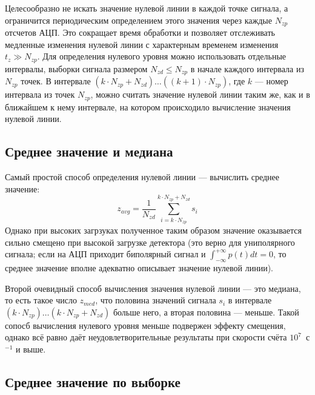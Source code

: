Целесообразно не искать значение нулевой линии в каждой точке сигнала, а ограничится периодическим определением этого значения через каждые $N_{zp}$ отсчетов АЦП. Это сокращает время обработки и позволяет отслеживать медленные изменения нулевой линии с характерным временем изменения $t_z \gg N_{zp}$. Для определения нулевого уровня можно использовать отдельные интервалы, выборки сигнала размером $N_{zd} \le N_{zp}$ в начале каждого интервала из $N_{zp}$ точек. В интервале $( k \cdot N_{zp} + N_{zd} ) \ldots ((k + 1) \cdot N_{zp})$, где $k$ --- номер интервала из точек $N_{zp}$, можно считать значение нулевой линии таким же, как и в ближайшем к нему интервале, на котором происходило вычисление значения нулевой линии. \cite{Khilkevitch2020}


\subsection{Среднее значение и медиана}

Самый простой способ определения нулевой линии --- вычислить среднее значение:
\begin{equation*}
  z_{avg} = \frac{1}{N_{zd}} \sum\limits_{i = k \cdot N_{zp}}^{  k \cdot N_{zp} + N_{zd} } s_i 
\end{equation*}
Однако при высоких загрзуках полученное таким образом значение оказывается сильно смещено при высокой загрузке детектора (это верно для униполярного сигнала; если на АЦП приходит биполярный сигнал и $ \int_{-\infty}^{+\infty} p(t) dt = 0 $, то среднее значение вполне адекватно описывает значение нулевой линии).  

Второй очевидный способ вычисления значения нулевой линии --- это медиана, то есть такое число $z_{med}$, что половина значений сигнала $s_i$ в интервале $(k \cdot N_{zp}) \ldots (k \cdot N_{zp} + N_{zd})$ больше него, а вторая половина --- меньше. Такой сопосб вычисления нулевого уровня меньше подвержен эффекту смещения, однако всё равно даёт неудовлетворительные результаты при скорости счёта $10^7$~с${}^{-1}$ и выше.~\cite{Khilkevitch2020}


\subsection{Среднее значение по выборке}

